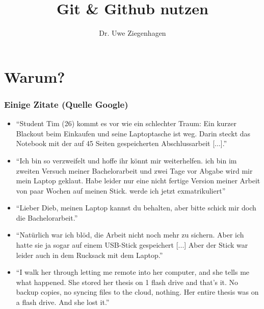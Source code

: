 \documentclass[12pt,ngerman]{beamer}
\title{Git \& Github nutzen}
\author{Dr. Uwe Ziegenhagen}
\begin{document}
\begin{frame}

\maketitle

\end{frame}

\begin{frame}

\tableofcontents

\end{frame}

\section{Warum?}

\begin{frame}[allowframebreaks]
\frametitle{Einige Zitate (Quelle Google)}

\begin{itemize}
	\item \enquote{Student Tim (26) kommt es vor wie ein schlechter
Traum: Ein kurzer Blackout beim Einkaufen und seine
Laptoptasche ist weg. Darin steckt das Notebook mit der
auf 45 Seiten gespeicherten Abschlussarbeit [...].}
	\item \enquote{Ich bin so verzweifelt und hoffe ihr könnt mir
weiterhelfen. ich bin im zweiten Versuch meiner
Bachelorarbeit und zwei Tage vor Abgabe wird mir mein
Laptop geklaut. Habe leider nur eine nicht fertige Version
meiner Arbeit von paar Wochen auf meinen Stick. werde
ich jetzt exmatrikuliert}
	\item \enquote{Lieber Dieb, meinen Laptop kannst du behalten, aber
bitte schick mir doch die Bachelorarbeit.}

\item \enquote{Natürlich war ich blöd, die Arbeit nicht noch mehr zu
sichern. Aber ich hatte sie ja sogar auf einem USB-Stick
gespeichert [...] Aber der Stick war leider auch in dem
Rucksack mit dem Laptop.}
\item  \enquote{I walk her through letting me remote into her computer,
and she tells me what happened. She stored her thesis on
1 flash drive and that’s it. No backup copies, no syncing
files to the cloud, nothing. Her entire thesis was on a
flash drive. And she lost it.}
\end{itemize}

\end{frame}
\end{document}
